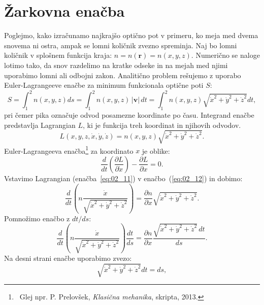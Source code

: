 \section{Žarkovna enačba}
\label{chap:zarkovna}
Poglejmo, kako izračunamo najkrajšo optično pot v primeru, ko 
meja med dvema snovema ni ostra, ampak se lomni količnik zvezno spreminja. 
Naj bo lomni količnik v splošnem funkcija kraja: $n = n(\mathbf{r}) = n(x,y,z)$.
Numerično se naloge lotimo tako, da snov razdelimo
na kratke odseke in na mejah med njimi uporabimo lomni ali odbojni zakon.
Analitično problem rešujemo z uporabo Euler-Lagrangeeve enačbe za minimum
funkcionala optične poti $S$:
\begin{equation}
 S = \int_1^2 n(x,y,z) ds  = \int_1^2 n(x,y,z)\,|\mathbf{v}|\,dt  = 
 \int_1^2 n(x,y,z) \sqrt{\dot{x}^2+ \dot{y}^2+\dot{z}^2} dt,
 \label{eq:02_10}
\end{equation}
pri čemer pika označuje odvod posamezne koordinate po času. Integrand
enačbe predstavlja Lagrangian $L$, ki je funkcija treh koordinat in njihovih
odvodov.
\begin{equation}
L(x, y, z, \dot{x}, \dot{y}, \dot{z}) = n(x,y,z) \sqrt{\dot{x}^2+ \dot{y}^2+\dot{z}^2}.
\label{eq:02_11}
\end{equation}
Euler-Lagrangeeva enačba\footnote{~Glej npr. P. Prelovšek, {\it Klasična
mehanika}, skripta, 2013.} za koordinato $x$ je oblike:
\begin{equation}
 \frac{d}{dt}\left(\frac{\partial L}{\partial \dot{x}}\right) - 
 \frac{\partial L}{\partial x} = 0.
 \label{eq:02_12}
\end{equation}
Vstavimo Lagrangian (enačba~\ref{eq:02_11}) 
v enačbo~(\ref{eq:02_12}) in dobimo:
\begin{equation}
\frac{d}{dt}\left(n \frac{\dot{x}}{\sqrt{\dot{x}^2+ \dot{y}^2+\dot{z}^2}} \right)
 = \frac{\partial n}{\partial x}\sqrt{\dot{x}^2+ \dot{y}^2+\dot{z}^2}.
  \label{eq:02_13}
\end{equation}
Pomnožimo enačbo z $dt/ds$:
\begin{equation}
\frac{d}{dt}\left(n \frac{\dot{x}}{\sqrt{\dot{x}^2+ \dot{y}^2+\dot{z}^2}} \right)
\frac{dt}{ds}
 = \frac{\partial n}{\partial x}\frac{\sqrt{\dot{x}^2+ \dot{y}^2+\dot{z}^2}\,dt}{ds}.
  \label{eq:02_14}
\end{equation}
Na desni strani enačbe uporabimo zvezo:
\begin{equation}
 \sqrt{\dot{x}^2+ \dot{y}^2+\dot{z}^2} dt = ds,
 \label{eq:02_15}
\end{equation}
